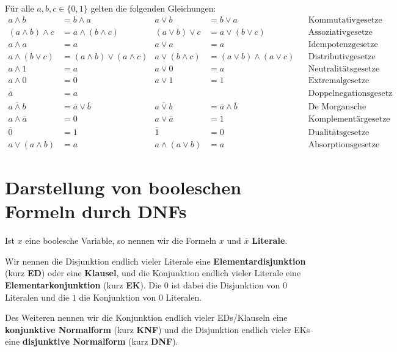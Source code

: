 \begin{prop}
	Für alle $a,b,c \in \{0,1\}$ gelten die folgenden Gleichungen: 
	\footnotesize
		\begin{align*}
			a \wedge b & = b \wedge a &  a \vee b & = b \vee a & & \text{Kommutativgesetze} 
			\\ (a \wedge b) \wedge c & = a \wedge (b \wedge c) &  (a \vee b) \vee c& = a \vee (b \vee c) & & \text{Assoziativgesetze} 
			\\ a \wedge a & = a  & a \vee a & = a  & & \text{Idempotenzgesetze} 
			\\ a \wedge (b \vee c) & = (a \wedge b) \vee (a \wedge c) &  a \vee (b \wedge c) & = (a \vee b) \wedge (a \vee c)  && \text{Distributivgesetze} 
			\\ a \wedge 1 & = a  & a \vee 0 & = a  & & \text{Neutralitätsgesetze} 
			\\ a \wedge 0 & = 0 &  a \vee 1 & = 1 & & \text{Extremalgesetze} 
			\\ \overline{\overline{a}} & = a & & & & \text{Doppelnegationsgesetz}			
			\\ \overline{a \wedge b} & = \overline{a} \vee \overline{b}  & \overline{a \vee b} & = \overline{a} \wedge \overline{b} & & \text{De Morgansche Gesetze} 
			\\ a \wedge \overline{a} & = 0  & a \vee \overline{a} & = 1 & & \text{Komplementärgesetze}
			\\ \overline{0} & = 1 & \overline{1} & = 0 & & \text{Dualitätsgesetze} 
			\\ a \vee (a \wedge b) & = a & a \wedge (a \vee b) & = a & & \text{Absorptionsgesetze}
		\end{align*} 
\end{prop} 





\section{Darstellung von booleschen Formeln durch DNFs} 

\begin{defn}
	Ist $x$ eine boolesche Variable, so nennen wir die Formeln $x$ und $\overline{x}$ \textbf{Literale}. 
	
	Wir nennen die Disjunktion endlich vieler Literale eine \textbf{Elementardisjunktion} (kurz \textbf{ED}) oder eine \textbf{Klausel}, und die Konjunktion endlich vieler Literale eine \textbf{Elementarkonjunktion} (kurz \textbf{EK}).  Die $0$ ist dabei die Disjunktion von $0$ Literalen und die $1$ die Konjunktion von $0$ Literalen. 
	
	Des Weiteren nennen wir die Konjunktion endlich vieler EDs/Klauseln eine \textbf{konjunktive Normalform} (kurz \textbf{KNF}) und die Disjunktion endlich vieler EKs eine \textbf{disjunktive Normalform} (kurz \textbf{DNF}). 
\end{defn} 


